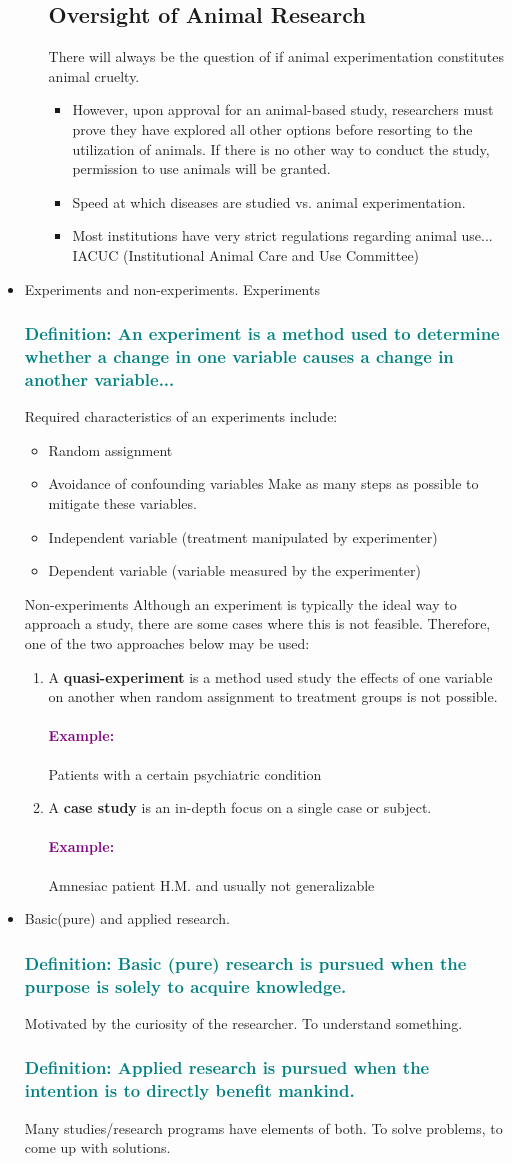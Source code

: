 \documentclass[12pt,a4paper]{article}
\newcommand{\definition}[1]{\subsubsection*{\textcolor{teal}{Definition: #1}}}
\newcommand{\example}[1]{\paragraph{\textcolor{purple}{Example:}} #1}
\begin{document}
\begin{itemize}
\begin{itemize}
			\subsection{Oversight of Animal Research}
			There will always be the question of if animal experimentation constitutes animal cruelty. 
			\begin{itemize}
				\item However, upon approval for an animal-based study, researchers must prove they have explored all other options before resorting to the utilization of animals. If there is no other way to conduct the study, permission to use animals will be granted. 
				\item Speed at which diseases are studied vs. animal experimentation.
				\item Most institutions have very strict regulations regarding animal use...
				\subitem IACUC (Institutional Animal Care and Use Committee)
			\end{itemize}
		\end{itemize} 
		\item Experiments and non-experiments.
		\subitem Experiments
		\definition{An \textbf{experiment} is a method used to determine whether a change in one variable \textbf{causes} a change in another variable...}
		\subsubitem Required characteristics of an experiments include:
		\begin{itemize}
			\item Random assignment 
			\item Avoidance of confounding variables
			\subitem Make as many steps as possible to mitigate these variables.  
			\item Independent variable (treatment manipulated by experimenter)
			\item Dependent variable (variable measured by the experimenter)
		\end{itemize} 
		\subitem Non-experiments
		\subsubitem Although an experiment is typically the ideal way to approach a study, there are some cases where this is not feasible. Therefore, one of the two approaches below may be used:
		\begin{enumerate}
			\item A \textbf{quasi-experiment} is a method used study the effects of one variable on another when random assignment to treatment groups is not possible. 
			\example{Patients with a certain psychiatric condition}
			\item A \textbf{case study} is an in-depth focus on a single case or subject.
			\example{Amnesiac patient H.M. and usually not generalizable}
		\end{enumerate}
		\item Basic(pure) and applied research.
		\definition{\textbf{Basic (pure) research} is pursued when the purpose is solely to acquire knowledge.} 
		\subitem Motivated by the curiosity of the researcher. 
		\subsubitem To understand something.
		\definition{\textbf{Applied research} is pursued when the intention is to directly benefit mankind.}
		\subitem Many studies/research programs have elements of both.  
		\subsubitem To solve problems, to come up with solutions. 
	\end{itemize}
	
\end{document}

